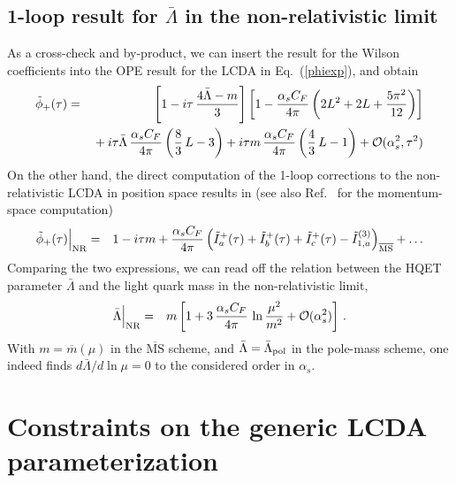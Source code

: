\documentclass[a4paper,11pt]{article}
\begin{document}
\subsection{1-loop result for \texorpdfstring{$\bar\Lambda$}{LambdaBar} in the non-relativistic limit}

As a cross-check and by-product, we can insert the result for the Wilson coefficients into the OPE result for the LCDA in Eq.~(\ref{phiexp}), and obtain
\begin{eqnarray}
    \tilde\phi_+(\tau) &=& 
    \left[1- i \tau \, \frac{4 \bar\Lambda  - m }{3} \right]\left[  1 - \frac{\alpha_s C_F}{4\pi} \left( 2 L^2+2 L + \frac{5\pi^2}{12} \right) \right]
    \cr 
    && {} + i \tau \bar\Lambda \, \frac{\alpha_s C_F}{4\pi} \left( \frac83 \, L -3 \right) 
      + i \tau m \, \frac{\alpha_s C_F}{4\pi} \left( \frac43 \, L - 1 \right)  + {\cal O}(\alpha_s^2,\tau^2)
    \label{phitauexp}
\end{eqnarray}
On the other hand, the direct computation of the 1-loop corrections to the non-relativistic LCDA in position space 
results in (see also Ref.~\cite{Bell:2008er} for the momentum-space computation)
\begin{eqnarray}
    \tilde\phi_+(\tau) \Big|_{\rm NR} &=& 1 - i \tau m+ \frac{\alpha_s C_F}{4\pi} \left( 
    \tilde I_a^+(\tau) + \tilde I_b^+(\tau) + \tilde I_c^+(\tau) - \tilde I_{1,a}^{(3)} \right)_{\overline{\mathrm{MS}}}  + \ldots 
\end{eqnarray}
Comparing the two expressions,
we can read off the relation between the HQET parameter $\bar\Lambda$ and the light quark mass in the non-relativistic limit,
\begin{eqnarray}
    \bar\Lambda \Big|_{\rm NR}&=& m \left[ 1 + 3 \, \frac{\alpha_s C_F}{4\pi} \, \ln \frac{\mu^2}{m^2} + {\cal O}(\alpha_s^2)\right] \,.
\end{eqnarray}
With $m = \overline{m}(\mu)$ in the $\overline{\mathrm{MS}}$ scheme, and $\bar \Lambda=\bar\Lambda_{\rm pol}$ in the pole-mass scheme, one indeed finds
$d\bar\Lambda/d\ln\mu=0$ to the considered order in $\alpha_s$.


\section{Constraints on the generic LCDA parameterization}
\label{sec:num}
\end{document}
